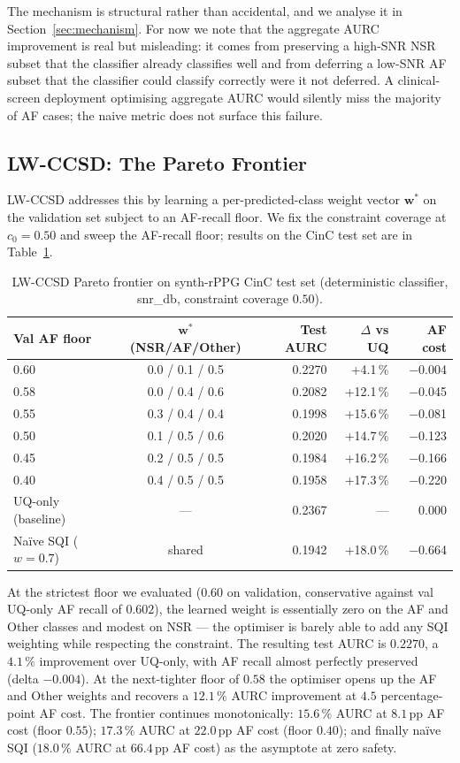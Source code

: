 \documentclass[journal]{IEEEtran}
\begin{document}
The mechanism is structural rather than accidental, and we analyse it in Section~\ref{sec:mechanism}. For now we note that the aggregate AURC improvement is real but misleading: it comes from preserving a high-SNR NSR subset that the classifier already classifies well and from deferring a low-SNR AF subset that the classifier could classify correctly were it not deferred. A clinical-screen deployment optimising aggregate AURC would silently miss the majority of AF cases; the naive metric does not surface this failure.

\subsection{LW-CCSD: The Pareto Frontier}
LW-CCSD addresses this by learning a per-predicted-class weight vector $\mathbf{w}^{*}$ on the validation set subject to an AF-recall floor. We fix the constraint coverage at $c_0 = 0.50$ and sweep the AF-recall floor; results on the CinC test set are in Table~\ref{tab:pareto}.

\begin{table}[!t]
\centering
\caption{LW-CCSD Pareto frontier on synth-rPPG CinC test set (deterministic classifier, snr\_db, constraint coverage $0.50$).}
\label{tab:pareto}
\begin{tabular}{lcrrr}
\toprule
Val AF floor & $\mathbf{w}^{*}$ (NSR/AF/Other) & Test AURC & $\Delta$ vs UQ & AF cost \\
\midrule
0.60 & 0.0 / 0.1 / 0.5 & 0.2270 & +4.1\,\% & $-$0.004 \\
0.58 & 0.0 / 0.4 / 0.6 & 0.2082 & +12.1\,\% & $-$0.045 \\
0.55 & 0.3 / 0.4 / 0.4 & 0.1998 & +15.6\,\% & $-$0.081 \\
0.50 & 0.1 / 0.5 / 0.6 & 0.2020 & +14.7\,\% & $-$0.123 \\
0.45 & 0.2 / 0.5 / 0.5 & 0.1984 & +16.2\,\% & $-$0.166 \\
0.40 & 0.4 / 0.5 / 0.5 & 0.1958 & +17.3\,\% & $-$0.220 \\
\midrule
UQ-only (baseline) & --- & 0.2367 & --- & ~0.000 \\
Na\"{i}ve SQI ($w{=}0.7$) & shared & 0.1942 & +18.0\,\% & $-$0.664 \\
\bottomrule
\end{tabular}
\end{table}

At the strictest floor we evaluated ($0.60$ on validation, conservative against val UQ-only AF recall of $0.602$), the learned weight is essentially zero on the AF and Other classes and modest on NSR --- the optimiser is barely able to add any SQI weighting while respecting the constraint. The resulting test AURC is $0.2270$, a $4.1\,\%$ improvement over UQ-only, with AF recall almost perfectly preserved (delta $-0.004$). At the next-tighter floor of $0.58$ the optimiser opens up the AF and Other weights and recovers a $12.1\,\%$ AURC improvement at $4.5$ percentage-point AF cost. The frontier continues monotonically: $15.6\,\%$ AURC at $8.1$\,pp AF cost (floor $0.55$); $17.3\,\%$ AURC at $22.0$\,pp AF cost (floor $0.40$); and finally na\"{i}ve SQI ($18.0\,\%$ AURC at $66.4$\,pp AF cost) as the asymptote at zero safety.
\end{document}
